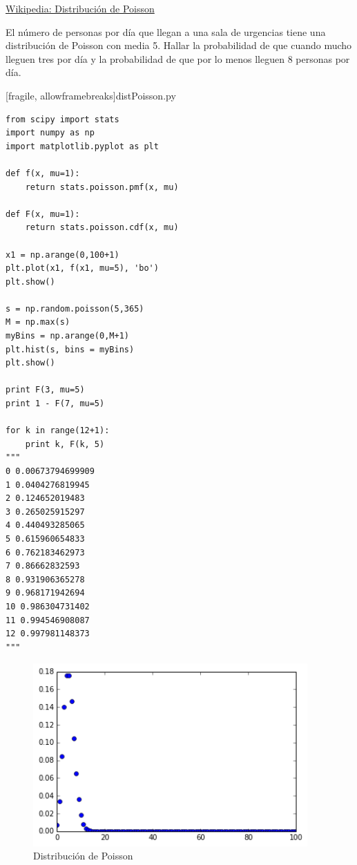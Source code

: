 \href{https://es.wikipedia.org/wiki/Distribuci\%C3\%B3n_de_Poisson}{Wikipedia: Distribución de Poisson}


 \begin{ejemplo}
  \label{exmp:7.6}
  El número de personas por día que llegan a una sala de urgencias tiene una distribución de Poisson con media 5. Hallar la probabilidad de que cuando mucho lleguen tres por día y la probabilidad de que por lo menos lleguen 8 personas por día.
 \end{ejemplo}




[fragile, allowframebreaks]{distPoisson.py}
 \begin{verbatim}
from scipy import stats
import numpy as np
import matplotlib.pyplot as plt

def f(x, mu=1):
    return stats.poisson.pmf(x, mu)

def F(x, mu=1):
    return stats.poisson.cdf(x, mu)

x1 = np.arange(0,100+1)
plt.plot(x1, f(x1, mu=5), 'bo')
plt.show()

s = np.random.poisson(5,365)
M = np.max(s)
myBins = np.arange(0,M+1)
plt.hist(s, bins = myBins)
plt.show()

print F(3, mu=5)
print 1 - F(7, mu=5)

for k in range(12+1):
    print k, F(k, 5)
"""
0 0.00673794699909
1 0.0404276819945
2 0.124652019483
3 0.265025915297
4 0.440493285065
5 0.615960654833
6 0.762183462973
7 0.86662832593
8 0.931906365278
9 0.968171942694
10 0.986304731402
11 0.994546908087
12 0.997981148373
"""
 \end{verbatim}



 \begin{figure}
 \centering
 \includegraphics[height=7cm,keepaspectratio=true]{./pe/distPoisson0.png}
 \caption{Distribución de Poisson}
\end{figure}




